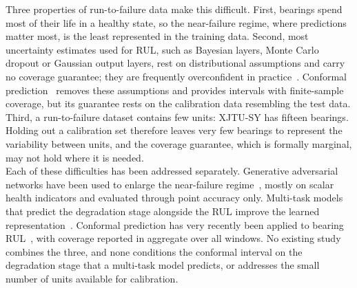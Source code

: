 \documentclass[review]{elsarticle}
\begin{document}
Three properties of run-to-failure data make this difficult. First,
bearings spend most of their life in a healthy state, so the
near-failure regime, where predictions matter most, is the least
represented in the training data. Second, most uncertainty estimates
used for RUL, such as Bayesian layers, Monte Carlo dropout or Gaussian
output layers, rest on distributional assumptions and carry no
coverage guarantee; they are frequently overconfident in
practice~\cite{wang_uncertainty-aware_2026}. Conformal
prediction~\cite{vovk2005algorithmic, lei2018distribution} removes
these assumptions and provides intervals with finite-sample coverage,
but its guarantee rests on the calibration data resembling the test
data. Third, a run-to-failure dataset contains few units: XJTU-SY has
fifteen bearings. Holding out a calibration set therefore leaves very
few bearings to represent the variability between units, and the
coverage guarantee, which is formally marginal, may not hold where it
is needed.\\

Each of these difficulties has been addressed separately. Generative
adversarial networks have been used to enlarge the near-failure
regime~\cite{9486650, lu_joint_2022}, mostly on scalar health
indicators and evaluated through point accuracy only. Multi-task
models that predict the degradation stage alongside the RUL improve the
learned representation~\cite{8709822}. Conformal prediction has very
recently been applied to bearing RUL~\cite{wang_uncertainty-aware_2026,
11373138}, with coverage reported in aggregate over all windows. No
existing study combines the three, and none conditions the conformal
interval on the degradation stage that a multi-task model predicts, or
addresses the small number of units available for calibration.\\
\end{document}
